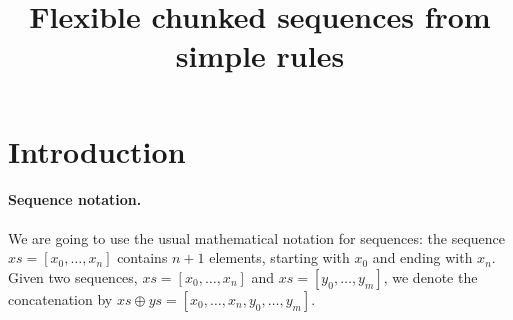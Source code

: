 \documentclass[10pt]{article}
\title{Flexible chunked sequences from simple rules}
\author{}
\begin{document}
\maketitle

\section{Introduction}

\paragraph{Sequence notation.} We are going to use the usual mathematical
notation for sequences: the sequence $xs = [x_0, \ldots, x_n]$
contains $n + 1$ elements, starting with $x_0$ and ending with
$x_n$. Given two sequences, $xs = [x_0, \ldots, x_n]$ and $xs = [y_0,
  \ldots, y_m]$, we denote the concatenation by $xs \oplus ys = [x_0,
  \ldots, x_n, y_0, \ldots, y_m]$.
\end{document}
